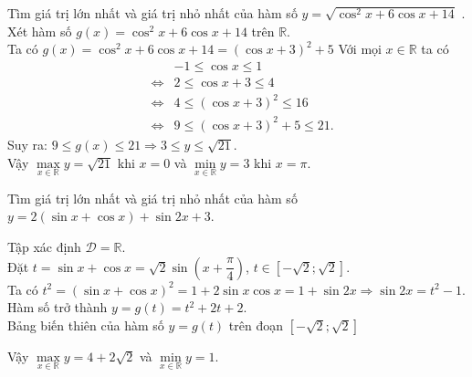 \begin{bt}%
	Tìm giá trị lớn nhất và giá trị nhỏ nhất của hàm số $y=\sqrt{\cos ^{2} x+6 \cos x+14}$ .
	\loigiai
	{
		Xét hàm số $g(x)=\cos ^{2} x+6 \cos x+14$ trên $\mathbb{R}$.\\
		Ta có $g(x)=\cos ^{2} x+6 \cos x+14=\left(\cos x +3\right)^2+5$
		Với mọi $x\in \mathbb{R}$ ta có
		\allowdisplaybreaks
		\begin{eqnarray*}
			& & -1\leq \cos x\leq 1\\
			&\Leftrightarrow&2\leq \cos x+3\leq 4\\
			&\Leftrightarrow&4\leq \left( \cos x+3\right)^2\leq 16\\
			&\Leftrightarrow&9\leq  \left( \cos x+3\right)^2+5\leq 21.
		\end{eqnarray*}
		Suy ra: $9\leq g(x)\leq 21 \Rightarrow 3\leq y\leq \sqrt{21}$.\\
		Vậy $\max\limits_{x \in \mathbb{R}} y=\sqrt{21}$ khi $x=0$ và $\min\limits_{x \in \mathbb{R}} y=3$ khi $x=\pi$.
	}
\end{bt}

\begin{bt}%
	Tìm giá trị lớn nhất và giá trị nhỏ nhất của hàm số  $y=2(\sin x+\cos x)+\sin 2 x+3$.
	\loigiai
	{Tập xác định $\mathscr{D}=\mathbb{R}$.\\
		Đặt $t=\sin x+ \cos x=\sqrt{2}\sin \left(x+\dfrac{\pi}{4}\right)$, $t\in \left[-\sqrt{2};\sqrt{2}\right]$.\\
		Ta có $t^2=\left(\sin x+ \cos x\right)^2=1+2\sin x\cos x=1+\sin 2x\Rightarrow \sin 2x =t^2-1$.\\
		Hàm số trở thành $y=g(t)=t^2+2t+2$. \\
		Bảng biến thiên của hàm số $y=g(t)$ trên đoạn $ \left[-\sqrt{2};\sqrt{2}\right]$
		\begin{center}
		\end{center}
		Vậy $\max\limits_{x \in \mathbb{R}} y=4+2\sqrt{2}$ và $\min\limits_{x \in \mathbb{R}} y=1$.
	}
\end{bt}

